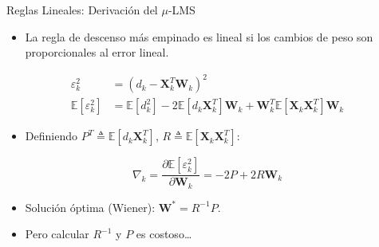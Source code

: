 \documentclass[aspectratio=169,utf8,spanish]{beamer}
\newcommand{\E}{\mathbb{E}}
\begin{document}
\begin{frame}{Reglas Lineales: Derivación del $\mu$-LMS}
  \begin{itemize}
    \item La regla de descenso más empinado es lineal si los cambios de peso son proporcionales al error lineal.
  \end{itemize}

  \begin{align*}
    \varepsilon_k^2 &= (d_k - \mathbf{X}_k^T \mathbf{W}_k)^2 \\
    \E[\varepsilon_k^2] &= \E[d_k^2] - 2\E[d_k\mathbf{X}_k^T]\mathbf{W}_k + \mathbf{W}_k^T \E[\mathbf{X}_k\mathbf{X}_k^T]\mathbf{W}_k
  \end{align*}

  \begin{itemize}
    \item Definiendo $P^T \triangleq \E[d_k\mathbf{X}_k^T]$, $R \triangleq \E[\mathbf{X}_k\mathbf{X}_k^T]$:
  \end{itemize}

  \begin{equation*}
    \nabla_k = \frac{\partial \E[\varepsilon_k^2]}{\partial \mathbf{W}_k} = -2P + 2R\mathbf{W}_k
  \end{equation*}

  \begin{itemize}
    \item Solución óptima (Wiener): $\mathbf{W}^* = R^{-1}P$.
    \item Pero calcular $R^{-1}$ y $P$ es costoso\dots
  \end{itemize}
\end{frame}
\end{document}
